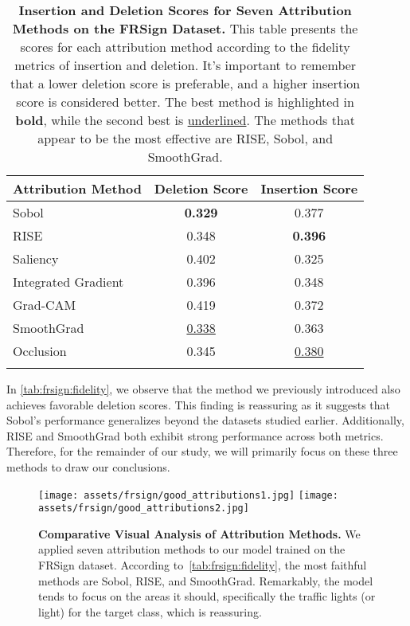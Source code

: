 \begin{table}[h]
\centering
\begin{tabular}{l c c}
\textbf{Attribution Method}&\textbf{Deletion Score}&\textbf{Insertion Score}\\
\hline
Sobol&\textbf{0.329}&0.377\\
RISE&0.348&\textbf{0.396}\\
Saliency&0.402&0.325\\
Integrated Gradient&0.396&0.348\\
Grad-CAM&0.419&0.372\\
SmoothGrad&\underline{0.338}&0.363\\
Occlusion&0.345&\underline{0.380}\\
\\
\hline
\end{tabular}
\caption{\textbf{Insertion and Deletion Scores for Seven Attribution Methods on the FRSign Dataset.} This table presents the scores for each attribution method according to the fidelity metrics of insertion and deletion. It's important to remember that a lower deletion score is preferable, and a higher insertion score is considered better. The best method is highlighted in \textbf{bold}, while the second best is \underline{underlined}. The methods that appear to be the most effective are RISE, Sobol, and SmoothGrad.}
\label{tab:frsign:fidelity}
\end{table}

In \autoref{tab:frsign:fidelity}, we observe that the method we previously introduced also achieves favorable deletion scores. This finding is reassuring as it suggests that Sobol's performance generalizes beyond the datasets studied earlier. Additionally, RISE and SmoothGrad both exhibit strong performance across both metrics. Therefore, for the remainder of our study, we will primarily focus on these three methods to draw our conclusions.

\begin{figure}[ht!]
\centering
\texttt{[image: assets/frsign/good\_attributions1.jpg]}
\texttt{[image: assets/frsign/good\_attributions2.jpg]}
\caption{\textbf{Comparative Visual Analysis of Attribution Methods.} We applied seven attribution methods to our model trained on the FRSign dataset. According to~\autoref{tab:frsign:fidelity}, the most faithful methods are Sobol, RISE, and SmoothGrad. Remarkably, the model tends to focus on the areas it should, specifically the traffic lights (or light) for the target class, which is reassuring.}
\label{fig:frsign:good_attributions}
\end{figure}

